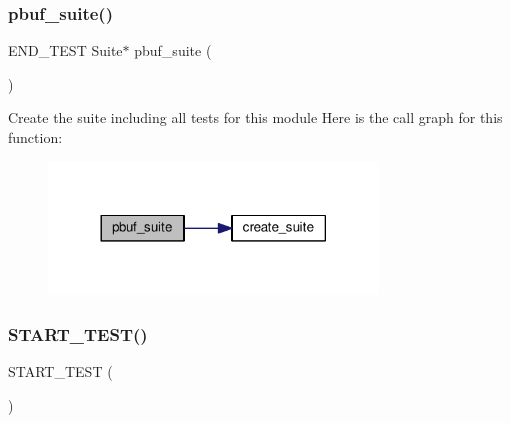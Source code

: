 \subsubsection{\texorpdfstring{pbuf\+\_\+suite()}{pbuf\_suite()}}
{\footnotesize\ttfamily E\+N\+D\+\_\+\+T\+E\+ST Suite$\ast$ pbuf\+\_\+suite (\begin{DoxyParamCaption}\item[{void}]{ }\end{DoxyParamCaption})}

Create the suite including all tests for this module Here is the call graph for this function\+:
\nopagebreak
\begin{figure}[H]
\begin{center}
\leavevmode
\includegraphics[width=248pt]{openmote-cc2538_2lwip_2test_2unit_2core_2test__pbuf_8c_a185b3b75c580fd71edb8a2348e2b256a_cgraph}
\end{center}
\end{figure}
\mbox{\label{openmote-cc2538_2lwip_2test_2unit_2core_2test__pbuf_8c_a3176e3e538ea354100abdb86e48e9eb3}} 
\subsubsection{\texorpdfstring{S\+T\+A\+R\+T\+\_\+\+T\+E\+S\+T()}{START\_TEST()}\hspace{0.1cm}{\footnotesize\ttfamily [1/5]}}
{\footnotesize\ttfamily S\+T\+A\+R\+T\+\_\+\+T\+E\+ST (\begin{DoxyParamCaption}\item[{test\+\_\+pbuf\+\_\+copy\+\_\+zero\+\_\+pbuf}]{ }\end{DoxyParamCaption})}


